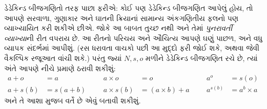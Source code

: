 \documentclass[../../../include/open-logic-section]{subfiles}
\begin{document}
ડેડેકિન્ડ બીજગણિતો તરફ પાછા ફરીએ: કોઈ પણ ડેડેકિન્ડ બીજગણિત આપેલું
હોય, તો આપણે સરવાળા, ગુણાકાર અને ઘાતની ક્રિયાનાં સામાન્ય અંકગણિતીય
ફલનો પણ વ્યાખ્યાયિત કરી શકીએ છીએ. જોકે આ બાબત તુચ્છ નથી અને તેમાં
\emph{પુનરાવર્તી વ્યાખ્યા}ની રીત વપરાય છે. આ રીતનો પરિચય અને ઔચિત્ય
આપણે ઘણું પાછળ, અને વધુ વ્યાપક સંદર્ભમાં આપીશું. (રસ ધરાવતા વાચકો
 પછી આ મુદ્દો ફરી જોઈ શકે, અથવા
\citealt[pp.~95--8]{Potter2004} જેવી વૈકલ્પિક રજૂઆત વાંચી શકે.) પરંતુ
જ્યાં $N, s, o$ મળીને ડેડેકિન્ડ બીજગણિત રચે છે, ત્યાં અંતે આપણે નીચે
પ્રમાણે ઠરાવી શકીશું:
\begin{align*}
	{a} + {o} &= {a} & & & {a} \times {o} &= {o} & & & {a}^{o} &= s(o)\\
{a} + {s}({b}) &= {s}({a}+{b}) &&& {a} \times {s}({b}) &= ({a}\times {b}) + {a}  & & & {a}^{{s}({b})} &= {a}^{b} \times {a}
\end{align*}
અને તે આશા મુજબ વર્તે છે એવું બતાવી શકીશું.
\end{document}
